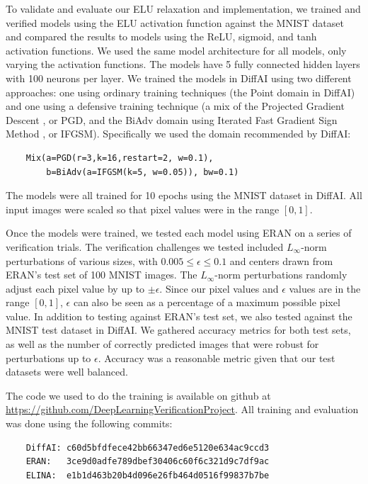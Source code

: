 \documentclass{llncs}
\begin{document}
To validate and evaluate our ELU relaxation and implementation, we trained and verified models using the ELU activation function against the MNIST dataset and compared the results to models using the ReLU, sigmoid, and tanh activation functions.
We used the same model architecture for all models, only varying the activation functions.
The models have 5 fully connected hidden layers with 100 neurons per layer.
We trained the models in DiffAI \cite{mirman2018differentiable} using two different approaches: one using ordinary training techniques (the Point domain in DiffAI) and one using a defensive training technique (a mix of the Projected Gradient Descent \cite{madry2017towards}, or PGD, and the BiAdv domain using Iterated Fast Gradient Sign Method \cite{goodfellow2014explaining}, or IFGSM).
Specifically we used the domain recommended by DiffAI: 
\begin{verbatim}
    Mix(a=PGD(r=3,k=16,restart=2, w=0.1),
        b=BiAdv(a=IFGSM(k=5, w=0.05)), bw=0.1)
\end{verbatim}
The models were all trained for 10 epochs using the MNIST dataset in DiffAI.
All input images were scaled so that pixel values were in the range $[0,1]$.

Once the models were trained, we tested each model using ERAN on a series of verification trials.
The verification challenges we tested included $L_\infty$-norm perturbations \cite{carlini2017towards} of various sizes, with $0.005 \leq \epsilon \leq 0.1$ and centers drawn from ERAN's test set of 100 MNIST images.
The $L_\infty$-norm perturbations randomly adjust each pixel value by up to $\pm \epsilon$.
Since our pixel values and $\epsilon$ values are in the range $[0,1]$, $\epsilon$ can also be seen as a percentage of a maximum possible pixel value.
In addition to testing against ERAN's test set, we also tested against the MNIST test dataset in DiffAI.
We gathered accuracy metrics for both test sets, as well as the number of correctly predicted images that were robust for perturbations up to $\epsilon$.
Accuracy was a reasonable metric given that our test datasets were well balanced.

The code we used to do the training is available on github at \url{https://github.com/DeepLearningVerificationProject}. All training and evaluation was done using the following commits:
\begin{verbatim}
    DiffAI: c60d5bfdfece42bb66347ed6e5120e634ac9ccd3
    ERAN:   3ce9d0adfe789dbef30406c60f6c321d9c7df9ac
    ELINA:  e1b1d463b20b4d096e26fb464d0516f99837b7be
\end{verbatim}
\end{document}

